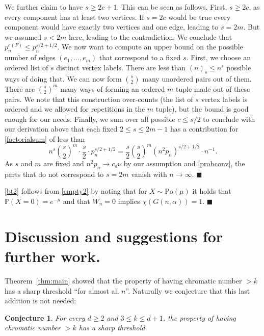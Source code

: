 \documentclass[11pt]{article}%
\newenvironment{proof}{\vspace{1ex}\noindent{\bf Proof.}}{\hspace*{\fill}$\blacksquare$\vspace{1ex}}
\newenvironment{proofof}[1]{\vspace{1ex}\noindent{\bf Proof of #1.}}{\hspace*{\fill}$\blacksquare$\vspace{1ex}}
\newtheorem{conjecture}[conjecture]{Conjecture}
\newcommand{\Pro}{\mathbb{P}}
\begin{document}
\begin{proof}
	We further claim to have $ s\geq 2c +1 $. This can be seen as follows. First, $ s\geq 2c $, as every component has at least two vertices. If $ s=2c $ would be true every component would have exactly two vertices and one edge, leading to $ s=2m $. But we assumed $ s<2m $ here, leading to the contradiction. We conclude that $ p_n^{e(F)}\leq p_n^{s/2+1/2} $. We now want to compute an upper bound on the possible number of edges $(e_1,\dots,e_m)  $ that correspond to a fixed $ s $. First, we choose an ordered list of $ s $ distinct vertex labels. There are less than $ (n)_s\leq n^s $ possible ways of doing that. We can now form $ \binom{s}{2} $ many unordered pairs out of them. There are $\binom{s}{2}^m  $ many ways of forming an ordered $ m $ tuple made out of these pairs. We note that this construction over-counts (the list of $ s $ vertex labels is ordered and we allowed for repetitions in the $ m $ tuple), but the bound is good enough for our needs. Finally, we sum over all possible  $ c\leq s/2 $ to conclude with our derivation above that each fixed $ 2\leq s\leq 2m-1 $ has a contribution for \cref{factorialsum} of less than
	\begin{equation*}
		n^s\binom{s}{2}^m\cdot \frac{s}{2}\cdot p_n^{s/2+1/2} =\frac{s}{2}\binom{s}{2}^m (n^2p_n)^{s/2+1/2} \cdot n^{-1}.
	\end{equation*}
	As $ s $ and $ m $ are fixed and $ n^2p_n\to c_d\nu $ by our assumption and \cref{probconv}, the parts that do not correspond to $ s=2m $ vanish with $ n\to \infty $.
\end{proof}

\begin{proofof}{\cref{bt2}}
    \cref{bt2} follows from \cref{empty2} by noting that for $X\sim\text{Po}(\mu)$ it holds 
    that $\Pro(X=0)=e^{-\mu}$ and that $W_n=0$ implies $\chi(G(n,\alpha))=1$. 
\end{proofof}



\section{Discussion and suggestions for further work.\label{sec:discuss}}



Theorem~\ref{thm:main} showed that the property of having chromatic number $> k$ has a sharp threshold 
``for almost all $n$''.
Naturally we conjecture that this last addition is not needed:

\begin{conjecture}
For every $d\geq 2$ and $3 \leq k \leq d+1$, the property of having chromatic number $>k$ 
has a sharp threshold.
\end{conjecture}
\end{document}
